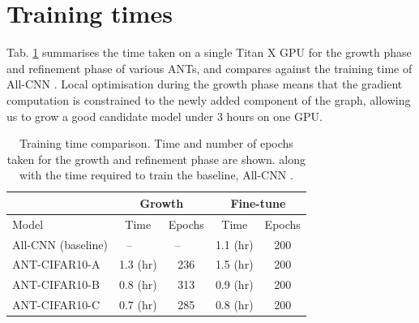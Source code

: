 \section{Training times}\label{sec:supp_traintime}
\vspace{-2mm}
Tab. \ref{table:traintime} summarises the time taken on a single Titan X GPU for the growth phase and refinement phase of various ANTs, and compares against the training time of All-CNN \citep{springenberg2014striving}. Local optimisation during the growth phase means that the gradient computation is constrained to the newly added component of the graph, allowing us to grow a good candidate model under $3$ hours on one GPU. 
\begin{table}[ht]
	\vspace{-2mm}
	\footnotesize
	\caption{Training time comparison. Time and number of epochs taken for the growth and refinement phase are shown. along with the time required to train the baseline, All-CNN \citep{springenberg2014striving}.}
	\label{table:traintime}
 	\vspace{-3mm}
	\begin{center}
		\begin{tabular}{l|c|c|c|c}
				\hline
				\multicolumn{1}{c}{} &  \multicolumn{2}{c}{\textbf{Growth}} & \multicolumn{2}{c}{\textbf{Fine-tune}}  \\
				\hline
				Model & Time & Epochs  & Time  & Epochs\\
				\hline
				All-CNN (baseline)&--~~~ & --~~~ & 1.1 (hr) &200 \\
				ANT-CIFAR10-A&1.3 (hr) & 236  & 1.5 (hr) &200 \\
				ANT-CIFAR10-B & 0.8 (hr) & 313 & 0.9 (hr) & 200\\
				ANT-CIFAR10-C&  0.7 (hr) &  285& 0.8 (hr) & 200 \\
				\hline
		\end{tabular}

	\end{center}
 	\vspace{-7mm}
\end{table}


